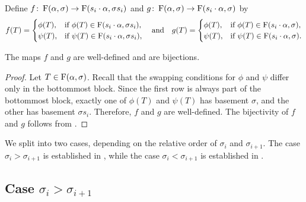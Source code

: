 \begin{definition}
    Define \(f \colon \Fill(\alpha, \sigma) \to \Fill(s_i \permact \alpha, \sigma s_i)\)
    and \(g \colon \Fill(\alpha, \sigma) \to \Fill(s_i \permact \alpha, \sigma)\) by
    \begin{equation*}
        f(T) =
        \begin{cases}
            \phi(T), & \text{if } \phi(T) \in {\Fill(s_i \cdot \alpha, \sigma s_i)}, \\
            \psi(T), & \text{if } \psi(T) \in {\Fill(s_i \cdot \alpha, \sigma s_i)},
        \end{cases}
        \quad \text{and} \quad
        g(T) =
        \begin{cases}
            \phi(T), & \text{if } \phi(T) \in {\Fill(s_i \cdot \alpha, \sigma)}, \\
            \psi(T), & \text{if } \psi(T) \in {\Fill(s_i \cdot \alpha, \sigma)}.
        \end{cases}
    \end{equation*}
\end{definition}

\begin{proposition}
    The maps \(f\) and \(g\) are well-defined and are bijections.
\end{proposition}

\begin{proof}
    Let \(T \in \Fill(\alpha, \sigma)\).
    Recall that the swapping conditions for \(\phi\) and \(\psi\) differ only in the bottommost block.
    Since the first row is always part of the bottommost block,
    exactly one of \(\phi(T)\) and \(\psi(T)\) has basement \(\sigma\),
    and the other has basement \(\sigma s_i\).
    Therefore, \(f\) and \(g\) are well-defined.
    The bijectivity of \(f\) and \(g\) follows from .
\end{proof}

We split  into two cases, depending on the relative order of \(\sigma_i\) and \(\sigma_{i+1}\).
The case \(\sigma_i > \sigma_{i+1}\) is established in , while the case \(\sigma_i < \sigma_{i+1}\) is established in .

\subsection{Case \texorpdfstring{$\sigma_i > \sigma_{i+1}$}{σi > σi+1}}

